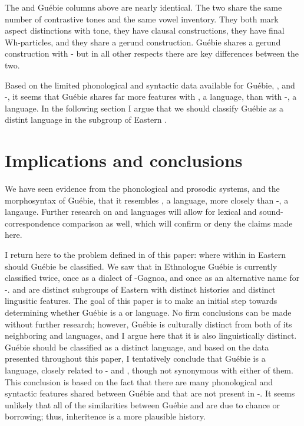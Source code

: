 \documentclass[output=paper,modfonts]{langscibook}
\begin{document}
The  and Guébie columns above are nearly identical. The two share the same number of contrastive tones and the same vowel inventory. They both mark aspect distinctions with tone, they have clausal  constructions, they have final Wh-particles, and they share a gerund construction. Guébie shares a gerund construction with - but in all other respects there are key differences between the two.

Based on the limited phonological and syntactic data available for Guébie, , and -, it seems that Guébie shares far more features with , a  language, than with -, a  language. In the following section I argue that we should classify Guébie as a distint language in the  subgroup of Eastern .

\section{Implications and conclusions}\label{sec:sande:Implications}

We have seen evidence from the phonological and prosodic systems, and the morphosyntax of Guébie, that it resembles , a  language, more closely than -, a  langauge. Further research on  and  languages will allow for lexical and sound-correspondence comparison as well, which will confirm or deny the claims made here.

I return here to the problem defined in  of this paper: where within in Eastern  should Guébie be classified. We saw that in Ethnologue \citep{LewisEtAl2013} Guébie is currently classified twice, once as a dialect of -Gagnoa, and once as an alternative name for -.  and  are distinct subgroups of Eastern  with distinct histories and distinct lingusitic features. The goal of this paper is to make an initial step towards determining whether Guébie is a  or  language. No firm conclusions can be made without further research; however, Guébie is culturally distinct from both of its neighboring  and  languages, and I argue here that it is also linguistically distinct. Guébie should be classified as a distinct language, and based on the data presented throughout this paper, I tentatively conclude that Guébie is a  language, closely related to - and , though not synonymous with either of them. This conclusion is based on the fact that there are many phonological and syntactic features shared between Guébie and  that are not present in -. It seems unlikely that all of the similarities between Guébie and  are due to chance or borrowing; thus, inheritence is a more plausible history.
\end{document}
